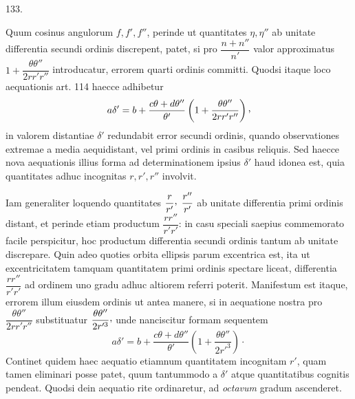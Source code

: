 \par{}\medskip
\begin{center}\hypertarget{native-179-article133}{}133.\end{center}
Quum cosinus angulorum $f,f',f''$, perinde ut quantitates $\eta,\eta''$ ab unitate
differentia secundi ordinis discrepent, patet, si pro $\dfrac{n+n''}{n'}$ valor approximatus
$1+\dfrac{\theta\theta''}{2rr'r''}$ introducatur, errorem quarti ordinis committi. Quodsi itaque loco
aequationis art. 114 haecce adhibetur
\[
a\delta'=b+\frac{c\theta+d\theta''}{\theta'}\left(1+\frac{\theta\theta''}{2rr'r''}\right)\mathpunct{\raisebox{.45ex}{,}}
\]
\hypertarget{native-180}{}in valorem distantiae $\delta'$ redundabit error secundi ordinis, quando observationes
extremae a media aequidistant, vel primi ordinis in casibus reliquis. Sed
haecce nova aequationis illius forma ad determinationem ipsius $\delta'$ haud idonea
est, quia quantitates adhuc incognitas $r,r',r''$ involvit.
\par
Iam generaliter loquendo quantitates $\dfrac{r}{r'}\mathpunct{\raisebox{.45ex}{,}}\;\dfrac{r''}{r'}$ ab unitate differentia primi
ordinis distant, et perinde etiam productum $\dfrac{rr''}{r'r'}$: in casu speciali saepius commemorato
facile perspicitur, hoc productum differentia secundi ordinis tantum
ab unitate discrepare. Quin adeo quoties orbita ellipsis parum excentrica est,
ita ut excentricitatem tamquam quantitatem primi ordinis spectare liceat, differentia
$\dfrac{rr''}{r'r'}$ ad ordinem uno gradu adhuc altiorem referri poterit. Manifestum
est itaque, errorem illum eiusdem ordinis ut antea manere, si in aequatione
nostra pro $\dfrac{\theta\theta''}{2rr'r''}$ substituatur $\dfrac{\theta\theta''}{2r'^3}\mathpunct{\raisebox{.45ex}{,}}$ unde nanciscitur formam sequentem
\[
a\delta'=b+\frac{c\theta+d\theta''}{\theta'}\left(1+\frac{\theta\theta''}{2r'^3}\right)\mathpunct{\cdot}
\]
Continet quidem haec aequatio etiamnum quantitatem incognitam $r'$, quam
tamen eliminari posse patet, quum tantummodo a $\delta'$ atque quantitatibus cognitis
pendeat. Quodsi dein aequatio rite ordinaretur, ad \textit{octavum} gradum ascenderet.
